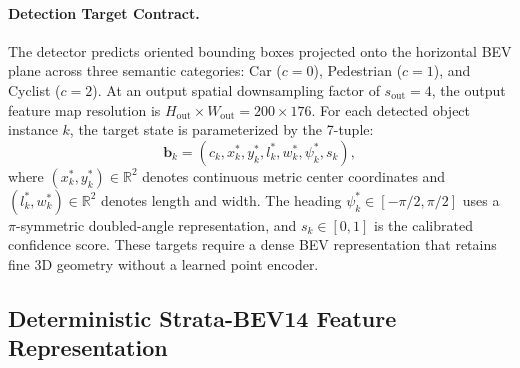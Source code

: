 \paragraph{Detection Target Contract.}
The detector predicts oriented bounding boxes projected onto the horizontal BEV plane across three semantic categories: Car ($c=0$), Pedestrian ($c=1$), and Cyclist ($c=2$). At an output spatial downsampling factor of $s_{\mathrm{out}} = 4$, the output feature map resolution is $H_{\mathrm{out}} \times W_{\mathrm{out}} = 200 \times 176$. For each detected object instance $k$, the target state is parameterized by the 7-tuple:
\begin{equation}
    \mathbf{b}_k = (c_k, x_k^*, y_k^*, l_k^*, w_k^*, \psi_k^*, s_k),
    \label{eq:target_tuple}
\end{equation}
where $(x_k^*, y_k^*) \in \mathbb{R}^2$ denotes continuous metric center coordinates and $(l_k^*, w_k^*) \in \mathbb{R}^2$ denotes length and width. The heading $\psi_k^* \in [-\pi/2, \pi/2]$ uses a $\pi$-symmetric doubled-angle representation, and $s_k \in [0, 1]$ is the calibrated confidence score. These targets require a dense BEV representation that retains fine 3D geometry without a learned point encoder.

\par\vspace{-0.5\baselineskip}
\subsection{Deterministic Strata-BEV14 Feature Representation}
\label{sec:strata_bev14}

